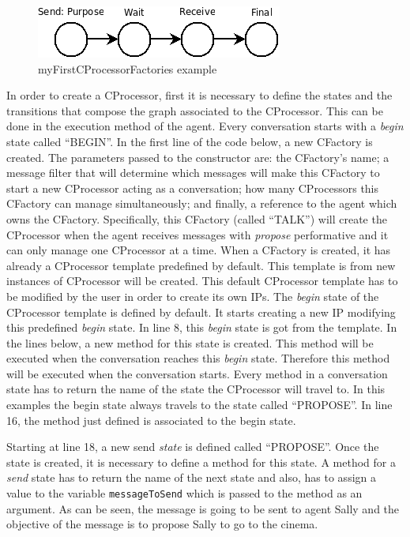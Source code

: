 \begin{figure}[!h]
\centering
\includegraphics[scale=0.6]{ProgrammingAgents/images/cfactory}
\caption{myFirstCProcessorFactories example}
\label{img:cfactory}
\end{figure}

In order to create a CProcessor, first it is necessary to define the states and the transitions that compose the graph associated to the CProcessor. This can be done in the execution method of the agent. Every conversation starts with a \textit{begin} state called ``BEGIN''. In the first line of the code below, a new CFactory is created. The parameters passed to the constructor are: the CFactory's name; a message filter that will determine which messages will make this CFactory to start a new CProcessor acting as a conversation; how many CProcessors this CFactory can manage simultaneously; and finally, a reference to the agent which owns the CFactory. Specifically, this CFactory  (called ``TALK'') will create the CProcessor when the agent receives messages with \textit{propose} performative and it can only manage one CProcessor at a time. When a CFactory is created, it has already a CProcessor template predefined by default. This template is from new instances of CProcessor will be created. This default CProcessor template has to be modified by the user in order to create its own IPs. The \emph{begin} state of the CProcessor template is defined by default. It starts creating a new IP modifying this predefined \emph{begin} state. In line 8, this \textit{begin} state is got from the template. In the lines below, a new method for this state is created. This method will be executed when the conversation reaches this \textit{begin} state. Therefore this method will be executed when the conversation starts. Every method in a conversation state has to return the name of the state the CProcessor will travel to. In this examples the begin state always travels to the state called ``PROPOSE''. In line 16, the method just defined is associated to the begin state.

Starting at line 18, a new send \textit{state} is defined called ``PROPOSE''. Once the state is created, it is necessary to define a method for this state. A method for a \textit{send} state has to return the name of the next state and also, has to assign a value to the variable \texttt{messageToSend} which is passed to the method as an argument. As can be seen, the message is going to be sent to agent Sally and the objective of the message is to propose Sally to go to the cinema.

